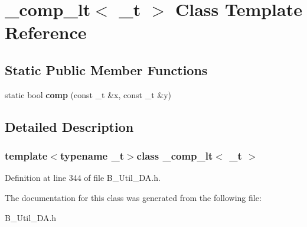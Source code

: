 \section{\-\_\-comp\-\_\-lt$<$ \-\_\-t $>$ Class Template Reference}
\label{class__comp__lt}
\subsection*{Static Public Member Functions}
\begin{DoxyCompactItemize}
\item 
static bool {\bfseries comp} (const \-\_\-t \&x, const \-\_\-t \&y)\label{class__comp__lt_aec999dedbbb1665449e4f63e629d23d6}

\end{DoxyCompactItemize}


\subsection{Detailed Description}
\subsubsection*{template$<$typename \-\_\-t$>$class \-\_\-comp\-\_\-lt$<$ \-\_\-t $>$}



Definition at line 344 of file B\-\_\-\-Util\-\_\-\-D\-A.\-h.



The documentation for this class was generated from the following file\-:\begin{DoxyCompactItemize}
\item 
B\-\_\-\-Util\-\_\-\-D\-A.\-h\end{DoxyCompactItemize}
